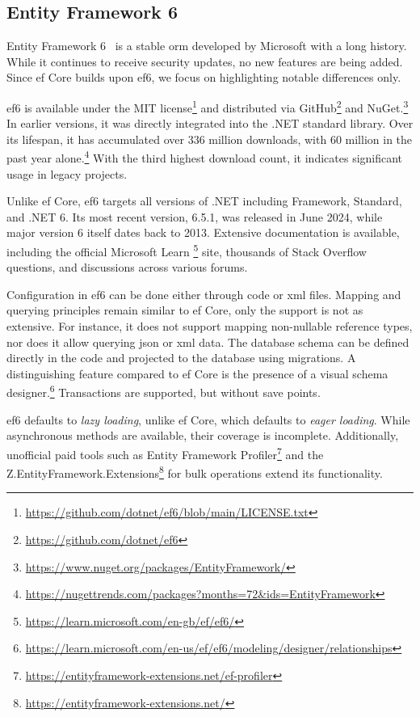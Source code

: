 \subsection{Entity Framework 6}
Entity Framework 6~\cite{ef6,ef6Repo} is a stable \acrshort{orm} developed by Microsoft with a long history. While it continues to receive security updates, no new features are being added. Since \acrshort{ef} Core builds upon \acrshort{ef}6, we focus on highlighting notable differences only.

\acrshort{ef}6 is available under the MIT license\footnote{\url{https://github.com/dotnet/ef6/blob/main/LICENSE.txt}} and distributed via GitHub\footnote{\url{https://github.com/dotnet/ef6}} and NuGet.\footnote{\url{https://www.nuget.org/packages/EntityFramework/}} In earlier versions, it was directly integrated into the .NET standard library. Over its lifespan, it has accumulated over 336 million downloads, with 60 million in the past year alone.\footnote{\url{https://nugettrends.com/packages?months=72&ids=EntityFramework}} With the third highest download count, it indicates significant usage in legacy projects.

Unlike \acrshort{ef} Core, \acrshort{ef}6 targets all versions of .NET including Framework, Standard, and .NET 6. Its most recent version, 6.5.1, was released in June 2024, while major version 6 itself dates back to 2013. Extensive documentation is available, including the official Microsoft Learn \footnote{\url{https://learn.microsoft.com/en-gb/ef/ef6/}} site, thousands of Stack Overflow questions, and discussions across various forums.

Configuration in \acrshort{ef}6 can be done either through code or \acrshort{xml} files. Mapping and querying principles remain similar to \acrshort{ef} Core, only the support is not as extensive. For instance, it does not support mapping non-nullable reference types, nor does it allow querying \acrshort{json} or \acrshort{xml} data.
The database schema can be defined directly in the code and projected to the database using migrations. A distinguishing feature compared to \acrshort{ef} Core is the presence of a visual schema designer.\footnote{\url{https://learn.microsoft.com/en-us/ef/ef6/modeling/designer/relationships}} Transactions are supported, but without save points. 

\acrshort{ef}6 defaults to \textit{lazy loading}, unlike \acrshort{ef} Core, which defaults to \textit{eager loading}. While asynchronous methods are available, their coverage is incomplete. Additionally, unofficial paid tools such as Entity Framework Profiler\footnote{\url{https://entityframework-extensions.net/ef-profiler}} and the Z.EntityFramework.Extensions\footnote{\url{https://entityframework-extensions.net/}} for bulk operations extend its functionality.

